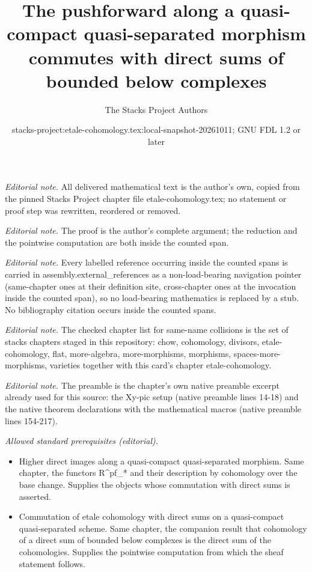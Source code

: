 \documentclass[10pt,a4paper]{amsart}
\title{The pushforward along a quasi-compact quasi-separated morphism commutes with direct sums of bounded below complexes}
\author{The Stacks Project Authors}
\date{stacks-project:etale-cohomology.tex:local-snapshot-20261011; GNU FDL 1.2 or later}
\theoremstyle{plain}
\theoremstyle{definition}
\theoremstyle{remark}
\numberwithin{equation}{subsection}
\begin{document}
\maketitle
\noindent\textit{Editorial note.} All delivered mathematical text is the author's own, copied from the pinned Stacks Project chapter file etale-cohomology.tex; no statement or proof step was rewritten, reordered or removed.\par\medskip
\noindent\textit{Editorial note.} The proof is the author's complete argument; the reduction and the pointwise computation are both inside the counted span.\par\medskip
\noindent\textit{Editorial note.} Every labelled reference occurring inside the counted spans is carried in assembly.external\_references as a non-load-bearing navigation pointer (same-chapter ones at their definition site, cross-chapter ones at the invocation inside the counted span), so no load-bearing mathematics is replaced by a stub. No bibliography citation occurs inside the counted spans.\par\medskip
\noindent\textit{Editorial note.} The checked chapter list for same-name collisions is the set of stacks chapters staged in this repository: chow, cohomology, divisors, etale-cohomology, flat, more-algebra, more-morphisms, morphisms, spaces-more-morphisms, varieties together with this card's chapter etale-cohomology.\par\medskip
\noindent\textit{Editorial note.} The preamble is the chapter's own native preamble excerpt already used for this source: the Xy-pic setup (native preamble lines 14-18) and the native theorem declarations with the mathematical macros (native preamble lines 154-217).\par\medskip
\noindent\textit{Allowed standard prerequisites (editorial).}\begin{itemize}
\item Higher direct images along a quasi-compact quasi-separated morphism. Same chapter, the functors R\textasciicircum{}pf\_* and their description by cohomology over the base change. Supplies the objects whose commutation with direct sums is asserted.
\item Commutation of etale cohomology with direct sums on a quasi-compact quasi-separated scheme. Same chapter, the companion result that cohomology of a direct sum of bounded below complexes is the direct sum of the cohomologies. Supplies the pointwise computation from which the sheaf statement follows.
\end{itemize}\medskip
\end{document}
